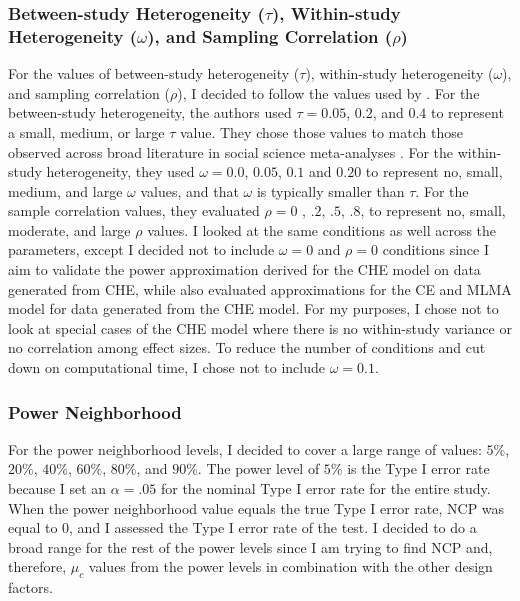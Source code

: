 \subsubsection{Between-study Heterogeneity ($\tau$), Within-study Heterogeneity ($\omega$), and Sampling Correlation ($\rho$) }
For the values of between-study heterogeneity ($\tau$), within-study heterogeneity ($\omega$), and sampling correlation ($\rho$), I decided to follow the values used by \textcite{vembye2023}. For the between-study heterogeneity, the authors used $\tau = 0.05$, $0.2$, and $0.4$ to represent a small, medium, or large  $\tau$ value. They chose those values to match those observed across broad literature in social science meta-analyses \autocite{LindenAudreyHelen2021HoRR}. For the within-study heterogeneity, they used $\omega = 0.0$, $0.05$, $0.1$ and $0.20$ to represent no, small, medium, and large $\omega$ values, and that $\omega$ is typically smaller than $\tau$. For the sample correlation values, they evaluated $\rho = 0$ , $.2$, $.5$, $.8$, to represent no, small, moderate, and large $\rho$ values. I looked at the same conditions as well across the parameters, except I decided not to include  $\omega = 0$ and $\rho = 0$ conditions since I aim to validate the power approximation derived for the CHE model on data generated from CHE, while \textcite{vembye2023} also evaluated approximations for the CE and MLMA model for data generated from the CHE model. For my purposes, I chose not to look at special cases of the CHE model where there is no within-study variance or no correlation among effect sizes. To reduce the number of conditions and cut down on computational time, I chose not to include $\omega=0.1$. 

\subsubsection{Power Neighborhood}
For the power neighborhood levels, I decided to cover a large range of values: $5\%$, $20\%$, $40\%$, $60\%$, $80\%$, and $90\%$. The power level of $5\%$ is the Type I error rate because I set an $\alpha = .05$ for the nominal Type I error rate for the entire study. When the power neighborhood value equals the true Type I error rate, NCP was equal to 0, and I assessed the Type I error rate of the test. I decided to do a broad range for the rest of the power levels since I am trying to find NCP and, therefore, $\mu_c$ values from the power levels in combination with the other design factors.



